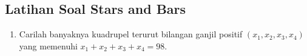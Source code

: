 \subsection{Latihan Soal Stars and Bars}
\begin{enumerate}
    \item Carilah banyaknya kuadrupel terurut bilangan ganjil positif $(x_1, x_2, x_3, x_4)$ yang memenuhi $x_1 + x_2 + x_3 + x_4 = 98$.
\end{enumerate}